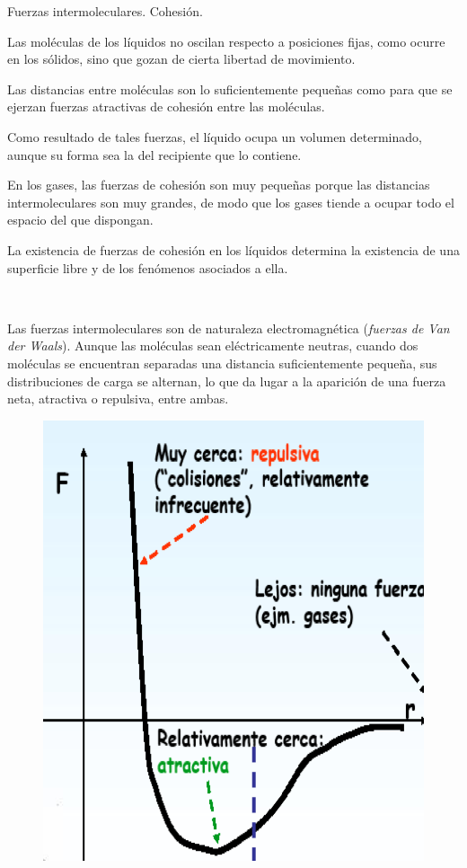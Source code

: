 \newpage %
\begin{myblock}{Fuerzas intermoleculares. Cohesión.}

\vspace{2mm} Las moléculas de los líquidos no oscilan respecto a posiciones fijas, como ocurre en los sólidos, sino que gozan de cierta libertad de movimiento. 

\vspace{2mm} Las distancias entre moléculas son lo suficientemente pequeñas como para que se ejerzan fuerzas atractivas de cohesión entre las moléculas. 

\vspace{2mm} Como resultado de tales fuerzas, el líquido ocupa un volumen determinado, aunque su forma sea la del recipiente que lo contiene. 

\vspace{2mm} En los gases, las fuerzas de cohesión son muy pequeñas porque las distancias intermoleculares son muy grandes, de modo que los gases tiende a ocupar todo el espacio del que dispongan. 

\vspace{2mm} La existencia de fuerzas de cohesión en los líquidos determina la existencia de una superficie libre y de los fenómenos asociados a ella. 


\vspace{2mm} 
\begin{multicols}{2}
$\quad$

Las fuerzas intermoleculares son de naturaleza electromagnética (\emph{fuerzas de Van der Waals}). Aunque las moléculas sean eléctricamente neutras, cuando dos moléculas se encuentran separadas una distancia suficientemente pequeña, sus distribuciones de carga se alternan, lo que da lugar a la aparición de una fuerza neta, atractiva o repulsiva, entre ambas. 

\begin{figure}[H]
	\centering
	\includegraphics[width=.35\textwidth]{imagenes/imagenes08/T08IM21.png}
\end{figure}
\end{multicols}


\end{myblock}
